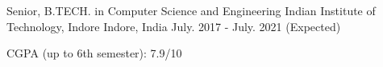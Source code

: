 
\begin{cventries}

  \cventry
    {Senior, B.TECH. in Computer Science and Engineering} %
    {Indian Institute of Technology, Indore} %
    {Indore, India} %
    {July. 2017 - July. 2021 (Expected)} %
    {
      \begin{cvitems} %
        \item {CGPA (up to 6th semester): 7.9/10}
      \end{cvitems}
    }

\end{cventries}
